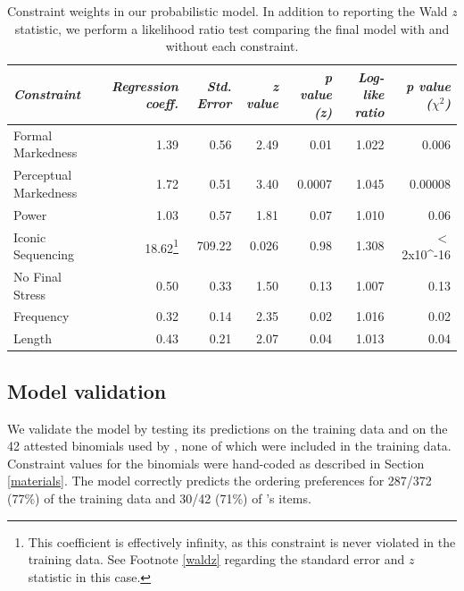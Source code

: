 \documentclass[authoryear]{elsarticle}
\begin{document}
\begin{table}[t]
\begin{minipage}[t]{\textwidth}


\renewcommand*\footnoterule{}


\centering
\begin{tabular}{ l  r  r  r  r r r }
\hline\hline
\emph{Constraint} & \emph{Regression coeff.} &\emph{Std. Error} & \emph{z value} & \emph{p value (z)} & \emph{Log-like ratio} & \emph{p value ($\chi^{2}$)}\\\hline    
 Formal Markedness   & 1.39     & 0.56   & 2.49  & 0.01 & 1.022 & 0.006  \\ 
Perceptual Markedness   & 1.72     & 0.51  &  3.40 &  0.0007& 1.045 & 0.00008    \\ 
 Power &     1.03 &     0.57&    1.81 &  0.07& 1.010 & 0.06     \\
Iconic Sequencing  &    18.62\footnote{This coefficient is effectively infinity, as this constraint is never violated in the training data. See Footnote \ref{waldz} regarding the standard error and $z$ statistic in this case.} &   709.22  &  0.026 &  0.98&   1.308 & $<$2x10^{-16}    \\
 No Final Stress   &    0.50   &   0.33 &   1.50&   0.13 & 1.007 & 0.13      \\
 Frequency   &    0.32    &  0.14 &   2.35  & 0.02& 1.016 & 0.02     \\  
 Length  &    0.43  &    0.21 &   2.07 &  0.04& 1.013  & 0.04    \\  \hline
\end{tabular}
\end{minipage}
\caption{Constraint weights in our probabilistic model. In addition to reporting the Wald \emph{z} statistic, we perform a likelihood ratio test comparing the final model with and without each constraint.}\label{t:weights}

\end{table} 


\subsection{Model validation}\label{validation}
We validate the model by testing its predictions on the training data and on the 42 attested binomials used by \citet{SiyanovaChanturia:2011ep}, none of which were included in the training data. Constraint values for the \citeauthor{SiyanovaChanturia:2011ep} binomials were hand-coded as described in Section \ref{materials}. The model correctly predicts the ordering preferences for 287/372 (77\%) of the training data and 30/42 (71\%) of \citeauthor{SiyanovaChanturia:2011ep}'s items.
\end{document}
